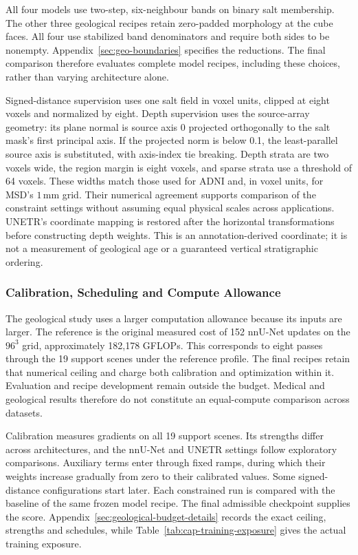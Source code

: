 \documentclass[12pt,a4paper]{article}
\begin{document}
All four models use two-step, six-neighbour bands on binary salt
membership. The other three geological recipes retain zero-padded
morphology at the cube faces. All four use stabilized band denominators
and require both sides to be nonempty.
Appendix~\ref{sec:geo-boundaries} specifies the reductions. The final
comparison therefore evaluates complete model recipes, including these
choices, rather than varying architecture alone.

Signed-distance supervision uses one salt field in voxel units, clipped
at eight voxels and normalized by eight. Depth supervision uses the
source-array geometry: its plane normal is source axis 0 projected
orthogonally to the salt mask's first principal axis. If the projected
norm is below 0.1, the least-parallel source axis is substituted, with
axis-index tie breaking. Depth strata are two voxels wide, the region
margin is eight voxels, and sparse strata use a threshold of 64 voxels.
These widths match those used for ADNI and, in voxel units, for MSD's
$1\,\mathrm{mm}$ grid. Their numerical agreement supports comparison of
the constraint settings without assuming equal physical scales across
applications.
UNETR's coordinate mapping is restored after the horizontal transformations before
constructing depth weights. This is an annotation-derived coordinate;
it is not a measurement of geological age or a guaranteed vertical
stratigraphic ordering.

\subsubsection{Calibration, Scheduling and Compute Allowance}

The geological study uses a larger computation allowance because its
inputs are larger. The reference is the original measured cost of 152
nnU-Net updates on the $96^3$ grid, approximately 182,178 GFLOPs. This
corresponds to eight passes through the 19 support scenes under the
reference profile. The final recipes retain that numerical ceiling and
charge both calibration and optimization within it. Evaluation and recipe
development remain outside the budget. Medical and geological results
therefore do not constitute an equal-compute comparison across datasets.

Calibration measures gradients on all 19 support scenes. Its strengths
differ across architectures, and the nnU-Net and UNETR settings follow
exploratory comparisons. Auxiliary terms enter through fixed ramps, during
which their weights increase gradually from zero to their calibrated values.
Some signed-distance configurations start later. Each constrained run is
compared with the baseline of the same frozen model recipe. The final
admissible checkpoint supplies the score.
Appendix~\ref{sec:geological-budget-details} records the exact ceiling,
strengths and schedules, while Table~\ref{tab:cap-training-exposure} gives
the actual training exposure.
\end{document}
